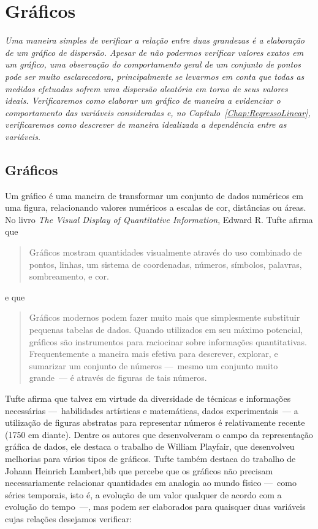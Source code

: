 \chapter{Gráficos}
\label{Chap:Graficos}

\begin{fullwidth}
{\it
Uma maneira simples de verificar a relação entre duas grandezas é a elaboração de um gráfico de dispersão. Apesar de não podermos verificar valores exatos em um gráfico, uma observação do comportamento geral de um conjunto de pontos pode ser muito esclarecedora, principalmente se levarmos em conta que todas as medidas efetuadas sofrem uma dispersão aleatória em torno de seus valores ideais. Verificaremos como elaborar um gráfico de maneira a evidenciar o comportamento das variáveis consideradas e, no Capítulo~\ref{Chap:RegressoLinear}, verificaremos como descrever de maneira idealizada a dependência entre as variáveis.
}
\end{fullwidth}

\section{Gráficos}

Um gráfico é uma maneira de transformar um conjunto de dados numéricos em uma figura, relacionando valores numéricos a escalas de cor, distâncias ou áreas. No livro \emph{The Visual Display of Quantitative Information}\cite{Tufte2001}, Edward R. Tufte
afirma que
\begin{quote}
	Gráficos mostram quantidades visualmente através do uso combinado de pontos, linhas, um sistema de coordenadas, números, símbolos, palavras, sombreamento, e cor.
\end{quote}
%
e que
\begin{quote}
	Gráficos modernos podem fazer muito mais que simplesmente substituir pequenas tabelas de dados. Quando utilizados em seu máximo potencial, gráficos são instrumentos para raciocinar sobre informações quantitativas. Frequentemente a maneira mais efetiva para descrever, explorar, e sumarizar um conjunto de números ---~mesmo um conjunto muito grande~--- é através de figuras de tais números.
\end{quote}

Tufte afirma que talvez em virtude da diversidade de técnicas e informações necessárias ---~habilidades artísticas e matemáticas, dados experimentais~--- a utilização de figuras abstratas para representar números é relativamente recente (1750 em diante). Dentre os autores que desenvolveram o campo da representação gráfica de dados, ele destaca o trabalho de William Playfair, que desenvolveu melhorias para vários tipos de gráficos. Tufte também destaca do trabalho de Johann Heinrich Lambert,bib que percebe que os gráficos não precisam necessariamente relacionar quantidades em analogia ao mundo físico ---~como séries temporais, isto é, a evolução de um valor qualquer de acordo com a evolução do tempo~---, mas podem ser elaborados para quaisquer duas variáveis cujas relações desejamos verificar:

